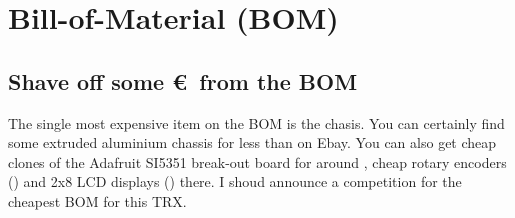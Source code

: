 \documentclass[10pt, a4paper,twoside]{scrartcl}
\begin{document}
\cleardoublepage
\section{Bill-of-Material (BOM)}


\subsection{Shave off some \euro\ from the BOM}
The single most expensive item on the BOM is the chasis. You can certainly find some extruded aluminium chassis for less than  on Ebay. You can also get cheap clones of the Adafruit SI5351 break-out board for around , cheap rotary encoders () and 2x8 LCD displays () there. I shoud announce a competition for the cheapest BOM for this TRX.

\cleardoublepage








\end{document}
